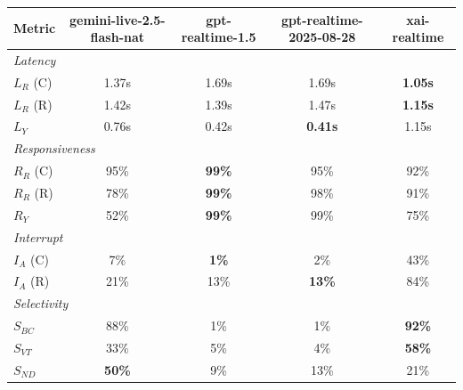 \begin{tabular}{@{}lcccc@{}}
\toprule
\textbf{Metric} & \textbf{gemini-live-2.5-flash-nat} & \textbf{gpt-realtime-1.5} & \textbf{gpt-realtime-2025-08-28} & \textbf{xai-realtime} \\
\midrule
\multicolumn{5}{l}{\textit{Latency}} \\
$L_R$ (C) & 1.37s & 1.69s & 1.69s & \textbf{1.05s} \\
$L_R$ (R) & 1.42s & 1.39s & 1.47s & \textbf{1.15s} \\
$L_Y$ & 0.76s & 0.42s & \textbf{0.41s} & 1.15s \\
\midrule
\multicolumn{5}{l}{\textit{Responsiveness}} \\
$R_R$ (C) & 95\% & \textbf{99\%} & 95\% & 92\% \\
$R_R$ (R) & 78\% & \textbf{99\%} & 98\% & 91\% \\
$R_Y$ & 52\% & \textbf{99\%} & 99\% & 75\% \\
\midrule
\multicolumn{5}{l}{\textit{Interrupt}} \\
$I_A$ (C) & 7\% & \textbf{1\%} & 2\% & 43\% \\
$I_A$ (R) & 21\% & 13\% & \textbf{13\%} & 84\% \\
\midrule
\multicolumn{5}{l}{\textit{Selectivity}} \\
$S_{BC}$ & 88\% & 1\% & 1\% & \textbf{92\%} \\
$S_{VT}$ & 33\% & 5\% & 4\% & \textbf{58\%} \\
$S_{ND}$ & \textbf{50\%} & 9\% & 13\% & 21\% \\
\bottomrule
\end{tabular}